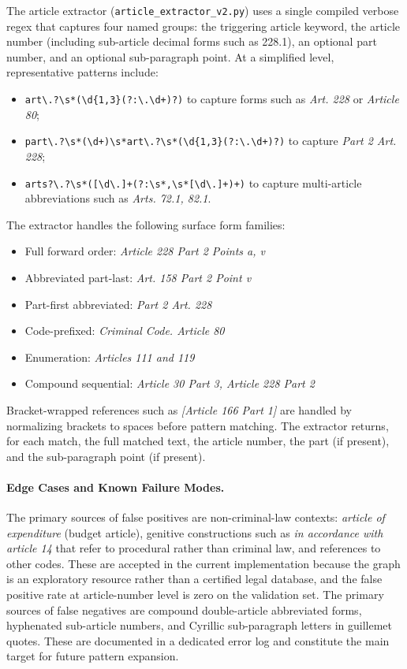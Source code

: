 \documentclass[11pt]{article}
\begin{document}
The article extractor (\texttt{article\_extractor\_v2.py}) uses a single compiled verbose regex that captures four named groups: the triggering article keyword, the article number (including sub-article decimal forms such as 228.1), an optional part number, and an optional sub-paragraph point. At a simplified level, representative patterns include:
\begin{itemize}
\item \verb|art\.?\s*(\d{1,3}(?:\.\d+)?)| to capture forms such as \textit{Art. 228} or \textit{Article 80};
\item \verb|part\.?\s*(\d+)\s*art\.?\s*(\d{1,3}(?:\.\d+)?)| to capture \textit{Part 2 Art. 228};
\item \verb|arts?\.?\s*([\d\.]+(?:\s*,\s*[\d\.]+)+)| to capture multi-article abbreviations such as \textit{Arts. 72.1, 82.1}.
\end{itemize}

The extractor handles the following surface form families:
\begin{itemize}
\item Full forward order: \textit{Article 228 Part 2 Points a, v}
\item Abbreviated part-last: \textit{Art. 158 Part 2 Point v}
\item Part-first abbreviated: \textit{Part 2 Art. 228}
\item Code-prefixed: \textit{Criminal Code. Article 80}
\item Enumeration: \textit{Articles 111 and 119}
\item Compound sequential: \textit{Article 30 Part 3, Article 228 Part 2}
\end{itemize}

Bracket-wrapped references such as \textit{[Article 166 Part 1]} are handled by normalizing brackets to spaces before pattern matching. The extractor returns, for each match, the full matched text, the article number, the part (if present), and the sub-paragraph point (if present).

\paragraph{Edge Cases and Known Failure Modes.}

The primary sources of false positives are non-criminal-law contexts: \textit{article of expenditure} (budget article), genitive constructions such as \textit{in accordance with article 14} that refer to procedural rather than criminal law, and references to other codes. These are accepted in the current implementation because the graph is an exploratory resource rather than a certified legal database, and the false positive rate at article-number level is zero on the validation set. The primary sources of false negatives are compound double-article abbreviated forms, hyphenated sub-article numbers, and Cyrillic sub-paragraph letters in guillemet quotes. These are documented in a dedicated error log and constitute the main target for future pattern expansion.
\end{document}
